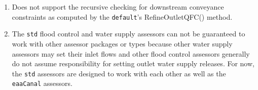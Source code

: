\begin {enumerate} 

 \item Does not support the recursive checking for downstream
 conveyance constraints as computed by the {\tt default}'s
 RefineOutletQFC() method.

 \item The {\tt std} flood control and water supply assessors can not
 be guaranteed to work with other assessor packages or types because
 other water supply assessors may set their inlet flows and other
 flood control assessors generally do not assume responsibility for
 setting outlet water supply releases.  For now, the {\tt std}
 assessors are designed to work with each other as well as the {\tt
 eaaCanal} assessors.

\end{enumerate}


